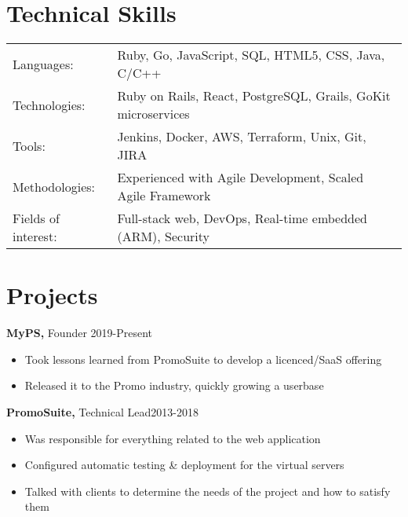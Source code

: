 \documentclass[line, centered]{res}
\begin{document}
\begin{resume}
\section{Technical Skills}
   \begin{tabular}{l l}
    Languages: & Ruby, Go, JavaScript, SQL, HTML5, CSS, Java, C/C++
    \\
    Technologies: &  Ruby on Rails, React, PostgreSQL, Grails, GoKit microservices
    \\
    Tools: & Jenkins, Docker, AWS, Terraform, Unix, Git, JIRA
    \\
    Methodologies: & Experienced with Agile Development, Scaled Agile Framework
    \\
    Fields of interest: & Full-stack web, DevOps, Real-time embedded (ARM), Security
 \end{tabular}


\section{Projects}
{\bf MyPS,} Founder     \hfill 2019-Present
\begin{itemize} \itemsep -2pt
    \item Took lessons learned from PromoSuite to develop a licenced/SaaS offering
    \item Released it to the Promo industry, quickly growing a userbase
\end{itemize}

{\bf PromoSuite,} Technical Lead\hfill   2013-2018
\begin{itemize} \itemsep -2pt
    \item Was responsible for everything related to the web application
    \item Configured automatic testing \& deployment for the virtual servers
    \item Talked with clients to determine the needs of the project and how to satisfy them
\end{itemize}

\end{resume}
\end{document}
